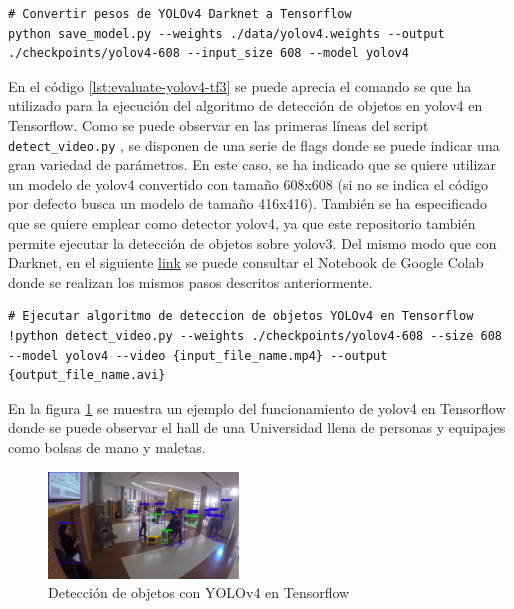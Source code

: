 \vspace{0.5cm}
\begin{lstlisting}[language=iPython,caption=Evaluación del detector de objetos YOLOv4 en Tensorflow (2),captionpos=b,label={lst:evaluate-yolov4-tf2}]
# Convertir pesos de YOLOv4 Darknet a Tensorflow
python save_model.py --weights ./data/yolov4.weights --output ./checkpoints/yolov4-608 --input_size 608 --model yolov4
\end{lstlisting}

En el código \ref{lst:evaluate-yolov4-tf3} se puede aprecia el comando se que ha utilizado para la ejecución del algoritmo de detección de objetos en \gls{yolov4} en Tensorflow. Como se puede observar en las primeras líneas del script \texttt{detect\_video.py} \cite{yolov4-tf-github}, se disponen de una serie de flags donde se puede indicar una gran variedad de parámetros. En este caso, se ha indicado que se quiere utilizar un modelo de \gls{yolov4} convertido con tamaño 608x608 (si no se indica el código por defecto busca un modelo de tamaño 416x416). También se ha especificado que se quiere emplear como detector \gls{yolov4}, ya que este repositorio también permite ejecutar la detección de objetos sobre \gls{yolo}v3. Del mismo modo que con Darknet, en el siguiente \href{https://colab.research.google.com/drive/1ZwcfV2hFZKcsyXaqKp9AGuEi5TY-QwVW?usp=sharing}{link} se puede consultar el Notebook de Google Colab donde se realizan los mismos pasos descritos anteriormente.

\vspace{0.5cm}
\begin{lstlisting}[language=iPython,caption=Evaluación del detector de objetos YOLOv4 en Tensorflow (3),captionpos=b,label={lst:evaluate-yolov4-tf3}]
# Ejecutar algoritmo de deteccion de objetos YOLOv4 en Tensorflow
!python detect_video.py --weights ./checkpoints/yolov4-608 --size 608 --model yolov4 --video {input_file_name.mp4} --output {output_file_name.avi}
\end{lstlisting}

En la figura \ref{fig:detection-yolov4-darknet-gba-far-video3} se muestra un ejemplo del funcionamiento de \gls{yolov4} en Tensorflow donde se puede observar el hall de una Universidad llena de personas y equipajes como bolsas de mano y maletas.

\begin{figure}[ht]
\centering
\includegraphics[width=0.45\textwidth]{img/chapters/desarrollo/GBA-far-video3-detection.jpg}
\caption{\label{fig:detection-yolov4-darknet-gba-far-video3}Detección de objetos con YOLOv4 en Tensorflow}
\end{figure}

